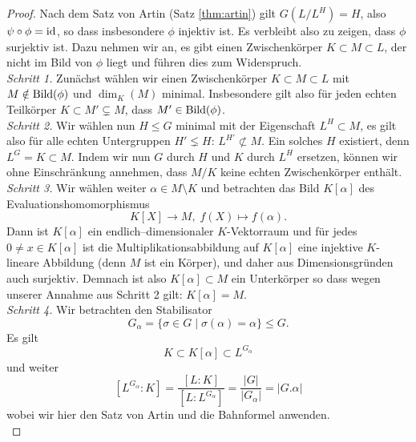 \documentclass{book}
\begin{document}
\begin{proof}
    Nach dem Satz von Artin (Satz \ref{thm:artin}) gilt $G(L/L^H) = H$, also
    $\psi \circ \phi = \id$, so dass insbesondere $\phi$ injektiv ist. Es
    verbleibt also zu zeigen, dass $\phi$ surjektiv ist. Dazu nehmen wir an, es
    gibt einen Zwischenkörper $K \subset M \subset L$, der nicht im Bild von
    $\phi$ liegt und führen dies zum Widerspruch.\\

    \noindent
    \emph{Schritt 1.} Zunächst wählen wir einen Zwischenkörper $K \subset M
    \subset L$ mit $M \notin \Bild(\phi)$ und $\dim_K(M)$ minimal. Insbesondere
    gilt also für jeden echten Teilkörper $K \subset M' \subsetneq M$, dass $M'
    \in \Bild(\phi)$.\\

    \noindent
    \emph{Schritt 2.} Wir wählen nun $H \le G$ minimal mit der Eigenschaft $L^H
    \subset M$, es gilt also für alle echten Untergruppen $H' \lneq H$: $L^{H'}
    \not \subset M$. Ein solches $H$ existiert, denn $L^G = K \subset M$. Indem
    wir nun $G$ durch $H$ und $K$ durch $L^H$ ersetzen, können wir ohne
    Einschränkung annehmen, dass $M/K$ keine echten Zwischenkörper enthält.\\

    \noindent
    \emph{Schritt 3.} Wir wählen weiter $\alpha \in M \setminus K$ und 
    betrachten das Bild $K[\alpha]$ des Evaluationshomomorphismus
    \[
        K[X] \to M,\; f(X) \mapsto f(\alpha).
    \]
    Dann ist $K[\alpha]$ ein endlich--dimensionaler $K$-Vektorraum und für
    jedes $0 \neq x \in K[\alpha]$ ist die Multiplikationsabbildung auf
    $K[\alpha]$ eine injektive $K$-lineare Abbildung (denn $M$ ist ein Körper),
    und daher aus Dimensionsgründen auch surjektiv. Demnach ist also $K[\alpha]
    \subset M$ ein Unterkörper so dass wegen unserer Annahme aus Schritt 2
    gilt: $K[\alpha] = M$.\\ 

    \noindent
    \emph{Schritt 4.} Wir betrachten den Stabilisator
    \[
        G_{\alpha} = \{ \sigma \in G \; | \; \sigma(\alpha) = \alpha \} \le G.
    \]
    Es gilt 
    \[
        K \subset K[\alpha] \subset L^{G_{\alpha}}
    \]
    und weiter
    \begin{equation}
        \label{eq:bahnartin}
        [L^{G_{\alpha}}:K] = \frac{[L:K]}{[L:L^{G_{\alpha}}]} = \frac{|G|}{|G_{\alpha}|} = |G.\alpha|
    \end{equation}
    wobei wir hier den Satz von Artin und die Bahnformel anwenden.\\


\end{proof}
\end{document}
